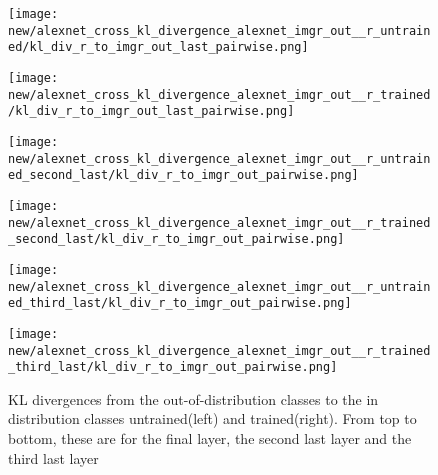 \documentclass{article}
\begin{document}
            \begin{figure}[H]
                \centering
                \begin{minipage}{0.45\textwidth}
                    \centering
                    \texttt{[image: new/alexnet\_cross\_kl\_divergence\_alexnet\_imgr\_out\_\_r\_untrained/kl\_div\_r\_to\_imgr\_out\_last\_pairwise.png]}
                    
                \end{minipage}\hfill
                \begin{minipage}{0.45\textwidth}
                    \centering
                    \texttt{[image: new/alexnet\_cross\_kl\_divergence\_alexnet\_imgr\_out\_\_r\_trained/kl\_div\_r\_to\_imgr\_out\_last\_pairwise.png]}
                \end{minipage}
                \begin{minipage}{0.45\textwidth}
                    \centering
                    \texttt{[image: new/alexnet\_cross\_kl\_divergence\_alexnet\_imgr\_out\_\_r\_untrained\_second\_last/kl\_div\_r\_to\_imgr\_out\_pairwise.png]}
                    
                \end{minipage}\hfill
                \begin{minipage}{0.45\textwidth}
                    \centering
                    \texttt{[image: new/alexnet\_cross\_kl\_divergence\_alexnet\_imgr\_out\_\_r\_trained\_second\_last/kl\_div\_r\_to\_imgr\_out\_pairwise.png]}
                \end{minipage}
                \begin{minipage}{0.45\textwidth}
                    \centering
                    \texttt{[image: new/alexnet\_cross\_kl\_divergence\_alexnet\_imgr\_out\_\_r\_untrained\_third\_last/kl\_div\_r\_to\_imgr\_out\_pairwise.png]}
                    
                \end{minipage}\hfill
                \begin{minipage}{0.45\textwidth}
                    \centering
                    \texttt{[image: new/alexnet\_cross\_kl\_divergence\_alexnet\_imgr\_out\_\_r\_trained\_third\_last/kl\_div\_r\_to\_imgr\_out\_pairwise.png]}
                \end{minipage}
                \caption{KL divergences from the out-of-distribution classes to the in distribution classes untrained(left) and trained(right). From top to bottom, these are for the final layer, the second last layer and the third last layer}
                \label{fig:cross_kl_divergence_b_to_a}
            \end{figure}
\end{document}
